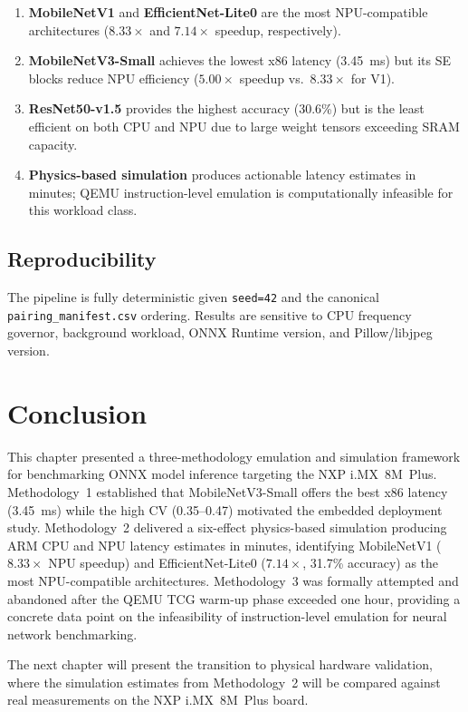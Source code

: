 \begin{enumerate}[itemsep=1pt, topsep=3pt]
    \item \textbf{MobileNetV1} and \textbf{EfficientNet-Lite0} are the most
          NPU-compatible architectures ($8.33\times$ and $7.14\times$ speedup,
          respectively).
    \item \textbf{MobileNetV3-Small} achieves the lowest x86 latency
          (3.45~ms) but its SE blocks reduce NPU efficiency ($5.00\times$
          speedup vs.\ $8.33\times$ for V1).
    \item \textbf{ResNet50-v1.5} provides the highest accuracy (30.6\%) but
          is the least efficient on both CPU and NPU due to large weight
          tensors exceeding SRAM capacity.
    \item \textbf{Physics-based simulation} produces actionable latency
          estimates in minutes; QEMU instruction-level emulation is
          computationally infeasible for this workload class.
\end{enumerate}

\subsection{Reproducibility}

The pipeline is fully deterministic given \texttt{seed=42} and the canonical
\texttt{pairing\_manifest.csv} ordering. Results are sensitive to CPU
frequency governor, background workload, ONNX Runtime version, and
Pillow/libjpeg version.

\section*{Conclusion}

This chapter presented a three-methodology emulation and simulation framework
for benchmarking ONNX model inference targeting the NXP i.MX~8M~Plus.
Methodology~1 established that MobileNetV3-Small offers the best x86 latency
(3.45~ms) while the high CV (0.35--0.47) motivated the embedded deployment
study. Methodology~2 delivered a six-effect physics-based simulation producing
ARM CPU and NPU latency estimates in minutes, identifying MobileNetV1
($8.33\times$ NPU speedup) and EfficientNet-Lite0 ($7.14\times$, 31.7\%
accuracy) as the most NPU-compatible architectures. Methodology~3 was
formally attempted and abandoned after the QEMU TCG warm-up phase exceeded
one hour, providing a concrete data point on the infeasibility of
instruction-level emulation for neural network benchmarking.

The next chapter will present the transition to physical hardware validation,
where the simulation estimates from Methodology~2 will be compared against
real measurements on the NXP i.MX~8M~Plus board.